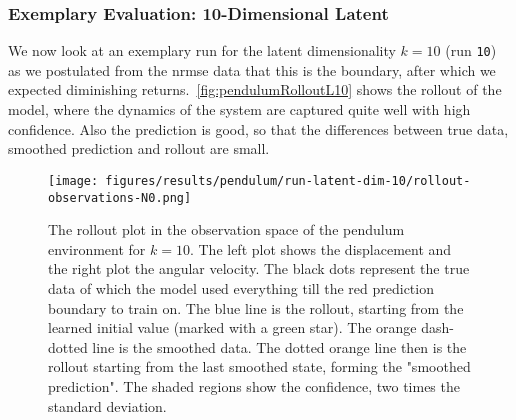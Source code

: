 		\subsubsection{Exemplary Evaluation: 10-Dimensional Latent}
			\label{subsubsec:pendulumL10}

			We now look at an exemplary run for the latent dimensionality \( k = 10 \) (run \texttt{10}) as we postulated from the \ac{nrmse} data that this is the boundary, after which we expected diminishing returns.~\autoref{fig:pendulumRolloutL10} shows the rollout of the model, where the dynamics of the system are captured quite well with high confidence. Also the prediction is good, so that the differences between true data, smoothed prediction and rollout are small.


			\begin{figure}[H]
				\centering
				\texttt{[image: figures/results/pendulum/run-latent-dim-10/rollout-observations-N0.png]}
				\caption[Rollout of the pendulum experiment for 10 latent dimensions]{The rollout plot in the observation space of the pendulum environment for \(k = 10\). The left plot shows the displacement and the right plot the angular velocity. The black dots represent the true data of which the model used everything till the red prediction boundary to train on. The blue line is the rollout, starting from the learned initial value (marked with a green star). The orange dash-dotted line is the smoothed data. The dotted orange line then is the rollout starting from the last smoothed state, forming the "smoothed prediction". The shaded regions show the confidence, \ie two times the standard deviation.}
				\label{fig:pendulumRolloutL10}
			\end{figure}


